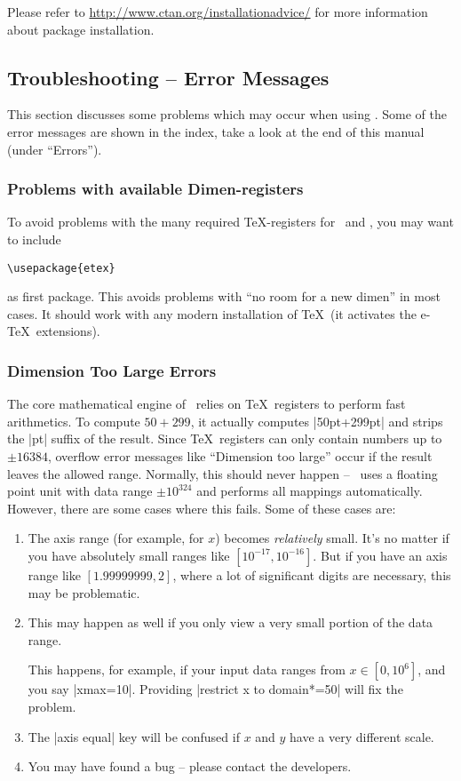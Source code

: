 Please refer to \url{http://www.ctan.org/installationadvice/} for more information about package installation.



\subsection{Troubleshooting -- Error Messages}
This section discusses some problems which may occur when using \PGFPlots.
Some of the error messages are shown in the index, take a look at the end of this manual (under ``Errors'').


\subsubsection{Problems with available Dimen-registers}
To avoid problems with the many required \TeX-registers for \PGF\ and \PGFPlots, you may want to include
\begin{verbatim}
\usepackage{etex}
\end{verbatim}
as first package. This avoids problems with ``no room for a new dimen''
%
in most cases. It should work with any modern installation of \TeX\ (it activates the e-\TeX\ extensions).

\subsubsection{Dimension Too Large Errors}
The core mathematical engine of \PGF\ relies on \TeX\ registers to perform fast arithmetics. To compute $50+299$, it actually computes |50pt+299pt| and strips the |pt| suffix of the result. Since \TeX\ registers can only contain numbers up to $\pm 16384$, overflow error messages like ``Dimension too large'' occur if the result leaves the allowed range. Normally, this should never happen -- \PGFPlots\ uses a floating point unit with data range $\pm 10^{324}$ and performs all mappings automatically. However, there are some cases where this fails. Some of these cases are:
\begin{enumerate}
	\item The axis range (for example, for $x$) becomes \emph{relatively} small. It's no matter if you have absolutely small ranges like $[10^{-17},10^{-16}]$. But if you have an axis range like $[1.99999999,2]$, where a lot of significant digits are necessary, this may be problematic.
	\item This may happen as well if you only view a very small portion of the data range.

	This happens, for example, if your input data ranges from $x\in [0,10^6]$, and you say |xmax=10|. Providing |restrict x to domain*=50| will fix the problem.
		
	\item The |axis equal| key will be confused if $x$ and $y$ have a very different scale.
	\item You may have found a bug -- please contact the developers.
\end{enumerate}

